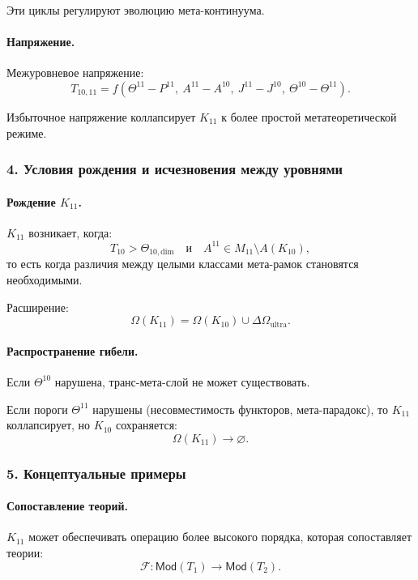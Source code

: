 Эти циклы регулируют эволюцию мета-континуума.

\paragraph{Напряжение.}
Межуровневое напряжение:
\[
T_{10,11} =
f(\Theta^{11} - P^{11},\ A^{11} - A^{10},\
  J^{11} - J^{10},\ \Theta^{10} - \Theta^{11}).
\]

Избыточное напряжение коллапсирует $K_{11}$ к более простой метатеоретической
режиме.

\subsubsection{4. Условия рождения и исчезновения между уровнями}

\paragraph{Рождение $K_{11}$.}
$K_{11}$ возникает, когда:
\[
T_{10} > \Theta_{10,\mathrm{dim}}
\quad\text{и}\quad
A^{11} \in M_{11} \setminus A(K_{10}),
\]
то есть когда различия между целыми классами мета-рамок становятся необходимыми.

Расширение:
\[
\Omega(K_{11}) = \Omega(K_{10}) \cup \Delta\Omega_{\mathrm{ultra}}.
\]

\paragraph{Распространение гибели.}
Если $\Theta^{10}$ нарушена, транс-мета-слой не может существовать.

Если пороги $\Theta^{11}$ нарушены (несовместимость функторов,
мета-парадокс), то $K_{11}$ коллапсирует, но $K_{10}$ сохраняется:
\[
\Omega(K_{11}) \rightarrow \varnothing.
\]

\subsubsection{5. Концептуальные примеры}

\paragraph{Сопоставление теорий.}
$K_{11}$ может обеспечивать операцию более высокого порядка, которая
сопоставляет теории:
\[
\mathcal{F} : \mathsf{Mod}(T_1) \rightarrow \mathsf{Mod}(T_2).
\]

